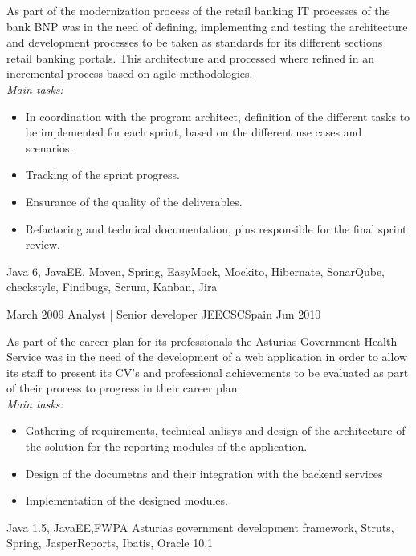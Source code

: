 \begin{experiences}
{As part of the modernization process of the retail banking IT processes of the bank BNP was in
the need of defining, implementing and testing the architecture and development processes to be
taken as standards for its different sections retail banking portals. This architecture and
processed where refined in an incremental process based on agile methodologies.  
\\
\emph{Main tasks:}    	
                      \begin{itemize}
                        \item In coordination with the program architect, definition of the different tasks to be implemented for each sprint, based on the different use cases and scenarios.
                        \item Tracking of the sprint progress.                       
                        \item Ensurance of the quality of the deliverables.
                        \item Refactoring and technical documentation,
plus responsible for the final sprint review.
                      \end{itemize}
                    }
                    {Java 6, JavaEE, Maven, Spring, EasyMock, Mockito, Hibernate, SonarQube, checkstyle, Findbugs, Scrum, Kanban, Jira}
                    
  \emptySeparator
  
  \experience
    {March 2009} {Analyst | Senior developer JEE}{CSC}{Spain}
    {Jun 2010}    {

As part of the career plan for its professionals the Asturias Government Health Service was in
the need of the development of a web application in order to allow its staff to present its CV’s
and professional achievements to be evaluated as part of their process to progress in their career
plan.    
\\
\emph{Main tasks:}    	
                      \begin{itemize}
                        \item Gathering of requirements, technical anlisys and design of the architecture of the solution for the reporting modules of the application.
                        \item Design of the documetns and their integration with the backend services                       
                        \item Implementation of the designed modules.
                      \end{itemize}
                    }
                    {Java 1.5, JavaEE,FWPA Asturias government development framework,
Struts, Spring, JasperReports, Ibatis, Oracle 10.1}
                    

\end{experiences}
